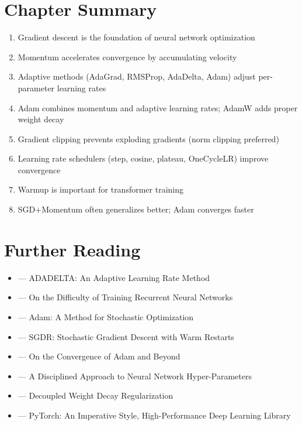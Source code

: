 \section{Chapter Summary}

\begin{enumerate}
    \item Gradient descent is the foundation of neural network optimization
    \item Momentum accelerates convergence by accumulating velocity
    \item Adaptive methods (AdaGrad, RMSProp, AdaDelta, Adam) adjust per-parameter learning rates
    \item Adam combines momentum and adaptive learning rates; AdamW adds proper weight decay
    \item Gradient clipping prevents exploding gradients (norm clipping preferred)
    \item Learning rate schedulers (step, cosine, plateau, OneCycleLR) improve convergence
    \item Warmup is important for transformer training
    \item SGD+Momentum often generalizes better; Adam converges faster
\end{enumerate}

\section{Further Reading}

\begin{itemize}
    \item \cite{zeiler2012adadelta} --- ADADELTA: An Adaptive Learning Rate Method
    \item \cite{pascanu2013difficulty} --- On the Difficulty of Training Recurrent Neural Networks
    \item \cite{kingma2014adam} --- Adam: A Method for Stochastic Optimization
    \item \cite{loshchilov2016sgdr} --- SGDR: Stochastic Gradient Descent with Warm Restarts
    \item \cite{reddi2018convergence} --- On the Convergence of Adam and Beyond
    \item \cite{smith2018disciplined} --- A Disciplined Approach to Neural Network Hyper-Parameters
    \item \cite{loshchilov2019decoupled} --- Decoupled Weight Decay Regularization
    \item \cite{paszke2019pytorch} --- PyTorch: An Imperative Style, High-Performance Deep Learning Library
\end{itemize}


